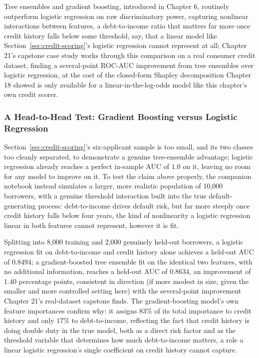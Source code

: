 \documentclass[../ai_in_finance]{subfiles}
\begin{document}
Tree ensembles and gradient boosting, introduced in Chapter 6, routinely outperform logistic regression on raw discriminatory power, capturing nonlinear interactions between features, a debt-to-income ratio that matters far more once credit history falls below some threshold, say, that a linear model like Section~\ref{sec:credit-scoring}'s logistic regression cannot represent at all; Chapter 21's capstone case study works through this comparison on a real consumer credit dataset, finding a several-point ROC-AUC improvement from tree ensembles over logistic regression, at the cost of the closed-form Shapley decomposition Chapter 18 showed is only available for a linear-in-the-log-odds model like this chapter's own credit scorer.

\subsubsection*{A Head-to-Head Test: Gradient Boosting versus Logistic Regression}
\label{sec:ml-credit-scoring}

Section~\ref{sec:credit-scoring}'s six-applicant sample is too small, and its two classes too cleanly separated, to demonstrate a genuine tree-ensemble advantage; logistic regression already reaches a perfect in-sample AUC of $1.0$ on it, leaving no room for any model to improve on it.
To test the claim above properly, the companion notebook instead simulates a larger, more realistic population of 10,000 borrowers, with a genuine threshold interaction built into the true default-generating process: debt-to-income drives default risk, but far more steeply once credit history falls below four years, the kind of nonlinearity a logistic regression linear in both features cannot represent, however it is fit.

Splitting into 8,000 training and 2,000 genuinely held-out borrowers, a logistic regression fit on debt-to-income and credit history alone achieves a held-out AUC of $0.8494$; a gradient-boosted tree ensemble fit on the identical two features, with no additional information, reaches a held-out AUC of $0.8634$, an improvement of $1.40$ percentage points, consistent in direction (if more modest in size, given the smaller and more controlled setting here) with the several-point improvement Chapter 21's real-dataset capstone finds. The gradient-boosting model's own feature importances confirm why: it assigns $83\%$ of its total importance to credit history and only $17\%$ to debt-to-income, reflecting the fact that credit history is doing double duty in the true model, both as a direct risk factor and as the threshold variable that determines how much debt-to-income matters, a role a linear logistic regression's single coefficient on credit history cannot capture.
\end{document}
